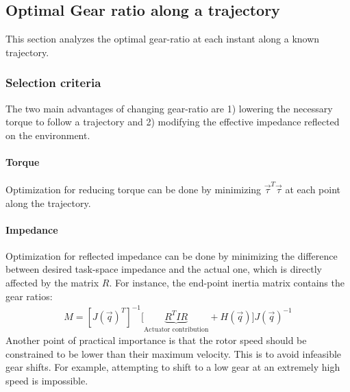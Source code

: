\subsection{Optimal Gear ratio along a trajectory}

This section analyzes the optimal gear-ratio at each instant along a known trajectory. 

\subsubsection{Selection criteria}
\label{sec:GearSelectionCriteria}

The two main advantages of changing gear-ratio are 1) lowering the necessary torque to follow a trajectory and 2) modifying the effective impedance reflected on the environment. 

\paragraph{Torque}
Optimization for reducing torque can be done by minimizing $\vec{\tau}^T \vec{\tau}$ at each point along the trajectory. 

\paragraph{Impedance}
Optimization for reflected impedance can be done by minimizing the difference between desired task-space impedance and the actual one, which is directly affected by the matrix $R$. For instance, the end-point inertia matrix contains the gear ratios: 
%
\begin{align}
	M = [J(\vec{q})^T]^{-1} \big [ \underbrace{ R^T I R }_{\text{Actuator contribution}} + H( \vec{q} ) \big ] J(\vec{q})^{-1}
 \label{eq:endpointmass}
\end{align}
%
Another point of practical importance is that the rotor speed should be constrained to be lower than their maximum velocity. This is to avoid infeasible gear shifts. For example, attempting to shift to a low gear at an extremely high speed is impossible. 

